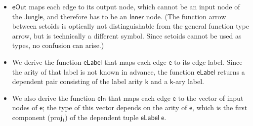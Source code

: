 \documentclass[copyright]{eptcs}
\newcommand{\Conid}[1]{\mathit{#1}}
\newcommand{\Varid}[1]{\mathit{#1}}
\renewcommand\Varid[1]{\mathord{\textsf{#1}}}
\let\Conid\Varid
\newcounter{x}
\newcounter{y}
\newcounter{z}
\begin{document}
\begin{itemize}
\item \ensuremath{\Varid{eOut}} maps each edge to its output node,
  which cannot be an input node of the \ensuremath{\Conid{Jungle}},
  and therefore has to be an \ensuremath{\Conid{Inner}} node.
  (The function arrow between setoids is optically not distinguishable
  from the general function type arrow, but is technically a different
  symbol. Since setoids cannot be used as types, no confusion can arise.)

\item We derive the function \ensuremath{\Varid{eLabel}} that maps each edge \ensuremath{\Varid{e}}
  to its edge label. Since the arity of that label is not known in
  advance,
  the function \ensuremath{\Varid{eLabel}} returns a dependent pair consisting
  of the label arity \ensuremath{\Varid{k}} and a \ensuremath{\Varid{k}}-ary label.

\item We also derive the function \ensuremath{\Varid{eIn}} that maps each edge \ensuremath{\Varid{e}}
  to the vector of input nodes of \ensuremath{\Varid{e}};
  the type of this vector depends on the arity of \ensuremath{\Varid{e}},
  which is the first component (\ensuremath{\Varid{proj₁}}) of the dependent tuple
  \ensuremath{\Varid{eLabel}\;\Varid{e}}.

\end{itemize}
\end{document}
